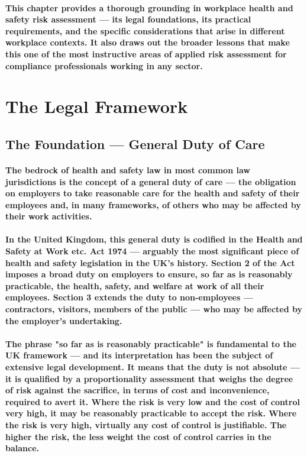 \paragraph{This chapter provides a thorough grounding in workplace health and safety risk assessment — its legal foundations, its practical requirements, and the specific considerations that arise in different workplace contexts. It also draws out the broader lessons that make this one of the most instructive areas of applied risk assessment for compliance professionals working in any sector.}

\section{The Legal Framework}

\subsection{The Foundation — General Duty of Care}
\paragraph{The bedrock of health and safety law in most common law jurisdictions is the concept of a \textbf{general duty of care} — the obligation on employers to take reasonable care for the health and safety of their employees and, in many frameworks, of others who may be affected by their work activities.}
\paragraph{In the United Kingdom, this general duty is codified in the \textbf{Health and Safety at Work etc. Act 1974} — arguably the most significant piece of health and safety legislation in the UK's history. Section 2 of the Act imposes a broad duty on employers to ensure, so far as is reasonably practicable, the health, safety, and welfare at work of all their employees. Section 3 extends the duty to non-employees — contractors, visitors, members of the public — who may be affected by the employer's undertaking.}
\paragraph{The phrase "\textbf{so far as is reasonably practicable}" is fundamental to the UK framework — and its interpretation has been the subject of extensive legal development. It means that the duty is not absolute — it is qualified by a proportionality assessment that weighs the degree of risk against the sacrifice, in terms of cost and inconvenience, required to avert it. Where the risk is very low and the cost of control very high, it may be reasonably practicable to accept the risk. Where the risk is very high, virtually any cost of control is justifiable. The higher the risk, the less weight the cost of control carries in the balance.}
